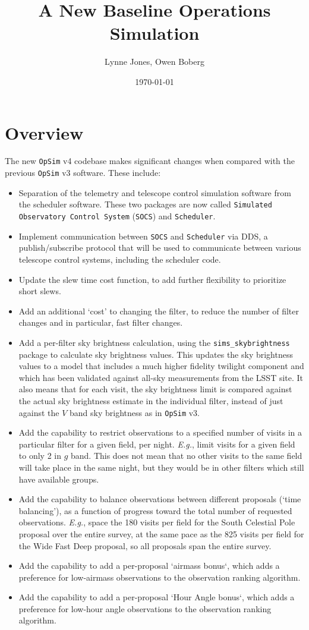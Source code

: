\documentclass[DM,lsstdraft,authoryear,toc]{lsstdoc}
\title{A New Baseline Operations Simulation}
\author{%
Lynne Jones, 
Owen Boberg
}
\date{\today}
\newcommand{\opsim}{\texttt{OpSim}\xspace}
\newcommand{\socs}{\texttt{SOCS}\xspace}
\newcommand{\sched}{\texttt{Scheduler}\xspace}
\newcommand{\simsky}{\texttt{sims\_skybrightness}\xspace}
\begin{document}
\maketitle

\section{Overview}

The new \opsim v4 codebase makes significant changes when compared with the previous \opsim v3 software. These include: 
\begin{itemize}
\item Separation of the telemetry and telescope control simulation software from the scheduler software. These two packages are now called \texttt{Simulated Observatory Control System} (\socs) and \texttt{Scheduler}. 
\item Implement communication between \socs and \sched via DDS, a publish/subscribe protocol that will be used to communicate between various telescope control systems, including the scheduler code.
\item Update the slew time cost function, to add further flexibility to prioritize short slews.
\item Add an additional `cost' to changing the filter, to reduce the number of filter changes and in particular, fast filter changes.
\item Add a per-filter sky brightness calculation, using the \simsky package to calculate sky brightness values. This updates the sky brightness values to a model that includes a much higher fidelity twilight component and which has been validated against all-sky measurements from the LSST site. It also means that for each visit, the sky brightness limit is compared against the actual sky brightness estimate in the individual filter, instead of just against the $V$ band sky brightness as in \opsim v3.
\item Add the capability to restrict observations to a specified number of visits in a particular filter for a given field, per night. {\it E.g.}, limit visits for a given field to only 2 in $g$ band. This does not mean that no other visits to the same field will take place in the same night, but they would be in other filters which still have available groups. 
\item Add the capability to balance observations between different proposals (`time balancing'), as a function of progress toward the total number of requested observations. {\it E.g.}, space the 180 visits per field for the South Celestial Pole proposal over the entire survey, at the same pace as the 825 visits per field for the Wide Fast Deep proposal, so all proposals span the entire survey.
\item Add the capability to add a per-proposal `airmass bonus`, which adds a preference for low-airmass observations to the observation ranking algorithm.
\item Add the capability to add a per-proposal `Hour Angle bonus`, which adds a preference for low-hour angle observations to the observation ranking algorithm. 
\end{itemize}
\end{document}
